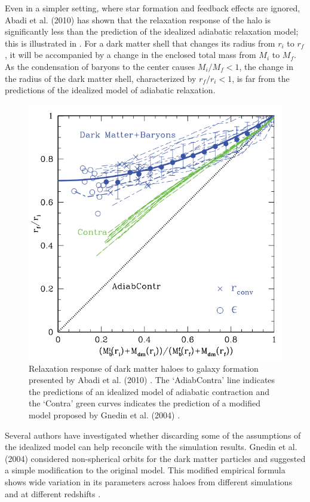 Even in a simpler setting, where star formation and feedback effects are ignored, Abadi et al. (2010) \citep{2010MNRAS.407..435A} has shown that the relaxation response of the halo is significantly less than the prediction of the idealized adiabatic relaxation model; this is illustrated in . For a dark matter shell that changes its radius from $r_i$ to $r_f$, it will be accompanied by a change in the enclosed total mass from $M_i$ to $M_f$. As the condensation of baryons to the center causes $M_i/M_f < 1$, the change in the radius of the dark matter shell, characterized by $r_f/r_i < 1$, is far from the predictions of the idealized model of adiabatic relaxation.

\begin{figure}
\centering
\includegraphics[width=0.7\linewidth]{Figures/Abadi_relxation.png}
\caption{Relaxation response of dark matter haloes to galaxy formation presented by Abadi et al. (2010) \citep{2010MNRAS.407..435A}. The `AdiabContra' line indicates the predictions of an idealized model of adiabatic contraction \citep[][]{1986ApJ...301...27B} and the `Contra' green curves indicates the prediction of a modified model proposed by Gnedin et al. (2004) \citep{2004ApJ...616...16G}.  }
\label{fig:illustrate_abadi}
\end{figure}

Several authors have investigated whether discarding some of the assumptions of the idealized model \citep[][]{1986ApJ...301...27B} can help reconcile with the simulation results. Gnedin et al. (2004) \citep{2004ApJ...616...16G} considered non-spherical orbits for the dark matter particles and suggested a simple modification to the original model. This modified empirical formula shows wide variation in its parameters across haloes from different simulations and at different redshifts \citep[][]{2006PhRvD..74l3522G,2010MNRAS.405.2161D}.

